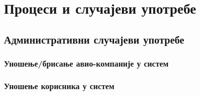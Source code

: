 \documentclass{article}
\begin{document}
\section{Процеси и случајеви употребе}

\subsection{Административни случајеви употребе}

\subsubsection{Уношење/брисање авио-компаније у систем}

\subsubsection{Уношење корисника у систем}
\end{document}
